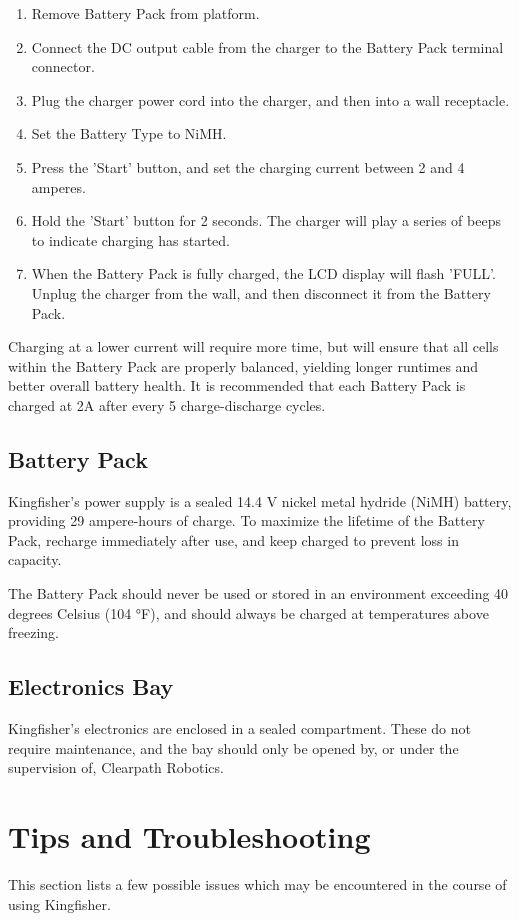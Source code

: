 \documentclass[]{clearpath-latex/clearpath-manual}
\begin{document}
\begin{enumerate}[nolistsep]
	\item Remove Battery Pack from platform.
	\item Connect the DC output cable from the charger to the Battery Pack terminal connector.
	\item Plug the charger power cord into the charger, and then into a wall receptacle.
	\item Set the Battery Type to NiMH.
	\item Press the 'Start' button, and set the charging current between 2 and 4 amperes.
	\item Hold the 'Start' button for 2 seconds. The charger will play a series of beeps to indicate charging has started.
	\item When the Battery Pack is fully charged, the LCD display will flash 'FULL'. Unplug the charger from the wall, and then disconnect it from the Battery Pack.
\end{enumerate}

Charging at a lower current will require more time, but will ensure that all cells within the Battery Pack are properly balanced, yielding longer runtimes and better overall battery health. It is recommended that each Battery Pack is charged at 2A after every 5 charge-discharge cycles.

\subsection{Battery Pack}
Kingfisher’s power supply is a sealed 14.4 V nickel metal hydride (NiMH) battery, providing 29 ampere-hours of charge. To maximize the lifetime of the Battery Pack, recharge immediately after use, and keep charged to prevent loss in capacity.

The Battery Pack should never be used or stored in an environment exceeding 40 degrees Celsius (104 °F), and should always be charged at temperatures above freezing.

\subsection{Electronics Bay}
Kingfisher's electronics are enclosed in a sealed compartment. These do not require maintenance, and the bay should only be opened by, or under the supervision of, Clearpath Robotics.

\newpage

\section{Tips and Troubleshooting}
This section lists a few possible issues which may be encountered in the course of using Kingfisher.
\end{document}
